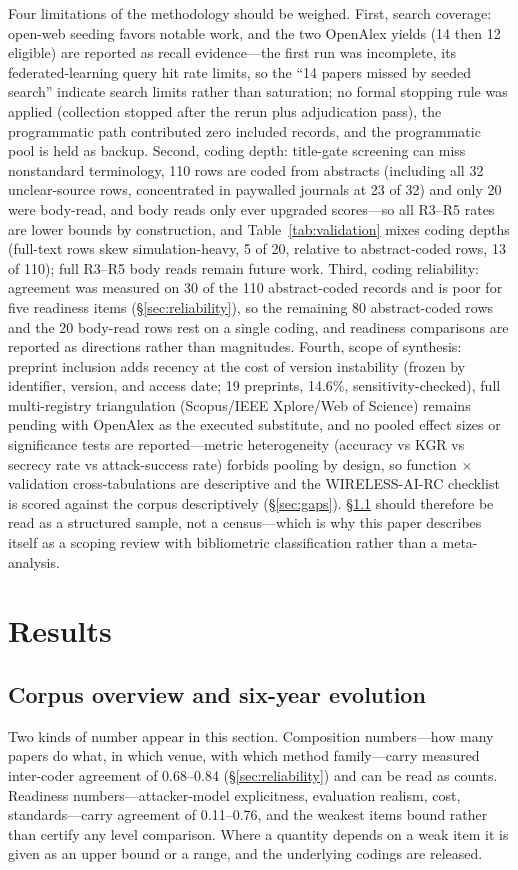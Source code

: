 Four limitations of the methodology should be weighed. First, search coverage: open-web seeding favors notable work, and the two OpenAlex yields (14 then 12 eligible) are reported as recall evidence---the first run was incomplete, its federated-learning query hit rate limits, so the ``14 papers missed by seeded search'' indicate search limits rather than saturation; no formal stopping rule was applied (collection stopped after the rerun plus adjudication pass), the programmatic path contributed zero included records, and the programmatic pool is held as backup. Second, coding depth: title-gate screening can miss nonstandard terminology, 110 rows are coded from abstracts (including all 32 unclear-source rows, concentrated in paywalled journals at 23 of 32) and only 20 were body-read, and body reads only ever upgraded scores---so all R3--R5 rates are lower bounds by construction, and Table~\ref{tab:validation} mixes coding depths (full-text rows skew simulation-heavy, 5 of 20, relative to abstract-coded rows, 13 of 110); full R3--R5 body reads remain future work. Third, coding reliability: agreement was measured on 30 of the 110 abstract-coded records and is poor for five readiness items (\S\ref{sec:reliability}), so the remaining 80 abstract-coded rows and the 20 body-read rows rest on a single coding, and readiness comparisons are reported as directions rather than magnitudes. Fourth, scope of synthesis: preprint inclusion adds recency at the cost of version instability (frozen by identifier, version, and access date; 19 preprints, 14.6\%, sensitivity-checked), full multi-registry triangulation (Scopus/IEEE Xplore/Web of Science) remains pending with OpenAlex as the executed substitute, and no pooled effect sizes or significance tests are reported---metric heterogeneity (accuracy vs KGR vs secrecy rate vs attack-success rate) forbids pooling by design, so function $\times$ validation cross-tabulations are descriptive and the WIRELESS-AI-RC checklist is scored against the corpus descriptively (\S\ref{sec:gaps}). \S\ref{sec:corpus} should therefore be read as a structured sample, not a census---which is why this paper describes itself as a scoping review with bibliometric classification rather than a meta-analysis.

\section{Results}
\subsection{Corpus overview and six-year evolution}
\label{sec:corpus}
Two kinds of number appear in this section. Composition numbers---how many papers do
what, in which venue, with which method family---carry measured inter-coder agreement of
0.68--0.84 (\S\ref{sec:reliability}) and can be read as counts. Readiness numbers---attacker-model
explicitness, evaluation realism, cost, standards---carry agreement of 0.11--0.76, and the
weakest items bound rather than certify any level comparison. Where a quantity depends on a weak
item it is given as an upper bound or a range, and the underlying codings are released.
